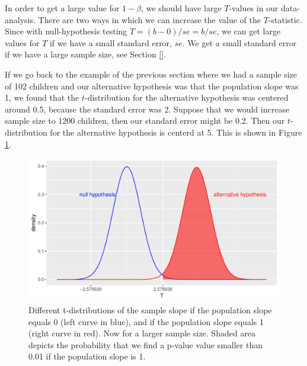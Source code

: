 \documentclass[]{report}\usepackage[]{graphicx}\usepackage[]{color}
\makeatletter
\def\maxwidth{ %
  \ifdim\Gin@nat@width>\linewidth
    \linewidth
  \else
    \Gin@nat@width
  \fi
}
\newenvironment{knitrout}{}{} %
\makeatother
\begin{document}
In order to get a large value for $1-\beta$, we should have large $T$-values in our data-analysis. There are two ways in which we can increase the value of the $T$-statistic. Since with null-hypothesis testing $T=(b-0)/se=b/se$, we can get large values for $T$ if we have a small standard error, $se$. We get a small standard error if we have a large sample size, see Section \ref{}.

If we go back to the example of the previous section where we had a sample size of 102 children and our alternative hypothesis was that the population slope was 1, we found that the $t$-distribution for the alternative hypothesis was centered around 0.5, because the standard error was 2. Suppose that we would increase sample size to 1200 children, then our standard error might be 0.2. Then our $t$-distribution for the alternative hypothesis is centerd at 5. This is shown in Figure \ref{fig:inf_24}.








\begin{knitrout}
\color{fgcolor}\begin{figure}

{\centering \includegraphics[width=\maxwidth]{figure/inf_24-1} 

}

\caption[Different t-distributions of the sample slope if the population slope equals 0 (left curve in blue), and if the population slope equals 1 (right curve in red)]{Different t-distributions of the sample slope if the population slope equals 0 (left curve in blue), and if the population slope equals 1 (right curve in red). Now for a larger sample size. Shaded area depicts the probability that we find a p-value value smaller than 0.01 if the population slope is 1.}\label{fig:inf_24}
\end{figure}


\end{knitrout}
\end{document}
